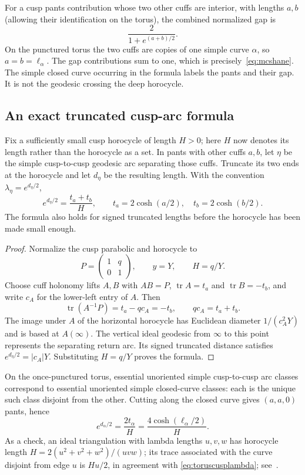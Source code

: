\documentclass[11pt,a4paper]{article}
\numberwithin{equation}{section}
\theoremstyle{definition}
\theoremstyle{remark}
\DeclareMathOperator{\tr}{tr}
\begin{document}
For a cusp pants contribution whose two other cuffs are interior, with
lengths $a,b$ (allowing their identification on the torus), the combined
normalized gap is
\begin{equation}
 \frac{2}{1+e^{(a+b)/2}}.
 \label{eq:cuspgap}
\end{equation}
On the punctured torus the two cuffs are copies of one simple curve
$\alpha$, so $a=b=\ell_\alpha$. The gap contributions sum to one,
which is precisely~\eqref{eq:mcshane}. The simple closed curve occurring
in the formula labels the pants and their gap. It is not the geodesic
crossing the deep horocycle.

\subsection{An exact truncated cusp-arc formula}

Fix a sufficiently small cusp horocycle of length $H>0$; here $H$ now
denotes its length rather than the horocycle as a set. In pants with other
cuffs $a,b$, let $\eta$ be the simple cusp-to-cusp geodesic arc separating
those cuffs. Truncate its two ends at the horocycle and let $d_\eta$ be
the resulting length. With the convention $\lambda_\eta=e^{d_\eta/2}$,
\begin{equation}
 \boxed{e^{d_\eta/2}=\frac{t_a+t_b}{H},
        \qquad t_a=2\cosh(a/2),\quad t_b=2\cosh(b/2).}
 \label{eq:cusplambda}
\end{equation}
The formula also holds for signed truncated lengths before the horocycle
has been made small enough.

\begin{proof}
Normalize the cusp parabolic and horocycle to
\[
 P=\begin{pmatrix}1&q\\0&1\end{pmatrix},\qquad y=Y,
 \qquad H=q/Y.
\]
Choose cuff holonomy lifts $A,B$ with $AB=P$, $\tr A=t_a$ and
$\tr B=-t_b$, and write $c_A$ for the lower-left entry of $A$. Then
\[
 \tr(A^{-1}P)=t_a-qc_A=-t_b,
 \qquad qc_A=t_a+t_b.
\]
The image under $A$ of the horizontal horocycle has Euclidean diameter
$1/(c_A^2Y)$ and is based at $A(\infty)$. The vertical ideal geodesic
from $\infty$ to this point represents the separating return arc.
Its signed truncated distance satisfies
$e^{d_\eta/2}=|c_A|Y$. Substituting $H=q/Y$ proves the formula.
\end{proof}

On the once-punctured torus, essential unoriented simple cusp-to-cusp arc
classes correspond to essential unoriented simple closed-curve classes:
each is the unique such class disjoint from the other. Cutting along the
closed curve gives $(a,a,0)$ pants, hence
\begin{equation}
 e^{d_\alpha/2}=\frac{2t_\alpha}{H}
              =\frac{4\cosh(\ell_\alpha/2)}{H}.
 \label{eq:toruscusplambda}
\end{equation}
As a check, an ideal triangulation with lambda lengths $u,v,w$ has
horocycle length $H=2(u^2+v^2+w^2)/(uvw)$; its trace associated with the
curve disjoint from edge $u$ is $Hu/2$, in agreement with
\eqref{eq:toruscusplambda}; see~\cite[Section 12]{Springborn}.
\end{document}
